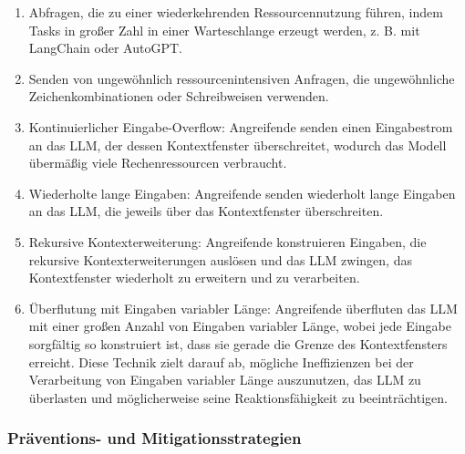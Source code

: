 \documentclass[
]{article}
\providecommand{\tightlist}{%
  \setlength{\itemsep}{0pt}\setlength{\parskip}{0pt}}
\begin{document}
\begin{enumerate}
\def\labelenumi{\arabic{enumi}.}
\tightlist
\item
  Abfragen, die zu einer wiederkehrenden Ressourcennutzung führen, indem
  Tasks in großer Zahl in einer Warteschlange erzeugt werden, z. B. mit
  LangChain oder AutoGPT.
\item
  Senden von ungewöhnlich ressourcenintensiven Anfragen, die
  ungewöhnliche Zeichenkombinationen oder Schreibweisen verwenden.
\item
  Kontinuierlicher Eingabe-Overflow: Angreifende senden einen
  Eingabestrom an das LLM, der dessen Kontextfenster überschreitet,
  wodurch das Modell übermäßig viele Rechenressourcen verbraucht.
\item
  Wiederholte lange Eingaben: Angreifende senden wiederholt lange
  Eingaben an das LLM, die jeweils über das Kontextfenster
  überschreiten.
\item
  Rekursive Kontexterweiterung: Angreifende konstruieren Eingaben, die
  rekursive Kontexterweiterungen auslösen und das LLM zwingen, das
  Kontextfenster wiederholt zu erweitern und zu verarbeiten.
\item
  Überflutung mit Eingaben variabler Länge: Angreifende überfluten das
  LLM mit einer großen Anzahl von Eingaben variabler Länge, wobei jede
  Eingabe sorgfältig so konstruiert ist, dass sie gerade die Grenze des
  Kontextfensters erreicht. Diese Technik zielt darauf ab, mögliche
  Ineffizienzen bei der Verarbeitung von Eingaben variabler Länge
  auszunutzen, das LLM zu überlasten und möglicherweise seine
  Reaktionsfähigkeit zu beeinträchtigen.
\end{enumerate}

\subsubsection{Präventions- und
Mitigationsstrategien}\label{pruxe4ventions--und-mitigationsstrategien}
\end{document}
